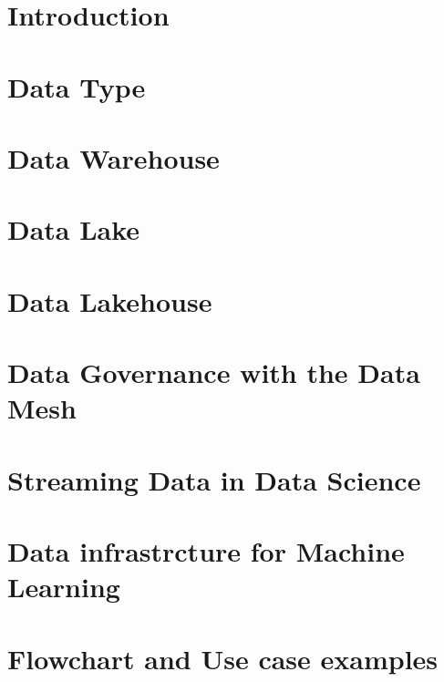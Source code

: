\documentclass[11pt]{article}
\begin{document}
    \section{Introduction}

    \section{Data Type}

    \section{Data Warehouse}

    \section{Data Lake}

    \section{Data Lakehouse}

    \section{Data Governance with the Data Mesh}

    \section{Streaming Data in Data Science}

    \section{Data infrastrcture for Machine Learning}

    \section{Flowchart and Use case examples}
\end{document}
